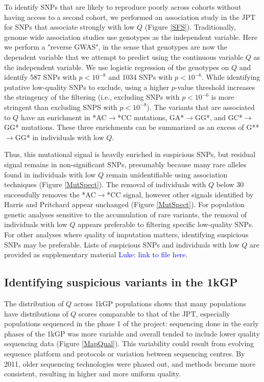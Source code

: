 \documentclass[9pt,lineno]{elife}
\newcommand{\luke}[1]{\textcolor{blue}{Luke: #1}}
\begin{document}
To identify SNPs that are likely to reproduce poorly across cohorts without having access to a second cohort, we performed an association study in the JPT for SNPs that associate strongly with low $Q$ (Figure \ref{SFS}).
Traditionally, genome wide association studies use genotypes as the independent variable. 
Here we perform a "reverse GWAS", in the sense that genotypes are now the dependent variable that we attempt to predict using the continuous variable $Q$ as the independent variable.
We use logistic regression of the genotypes on $Q$ and identify 587 SNPs with $p < 10^{-8}$ and 1034 SNPs with $ p < 10^{-6}$. 
While identifying putative low-quality SNPs to exclude, using a higher $p$-value threshold increases the stringency of the filtering (i.e., excluding SNPs with $ p < 10^{-6}$ is more stringent than excluding SNPS with $p < 10^{-8}$). 
The variants that are associated to $Q$ have an enrichment in *AC${\rightarrow}$*CC mutations, GA*${\rightarrow}$GG*, and GC*${\rightarrow}$GG* mutations.
These three enrichments can be summarized as an excess of G**${\rightarrow}$GG* in individuals with low $Q$.

Thus, this mutational signal is heavily enriched in suspicious SNPs, but residual signal remains in non-significant SNPs, presumably because many rare alleles found in individuals with low $Q$ remain unidentifiable using association techniques (Figure \ref{MutSpect}).
The removal of individuals with $Q$ below 30 successfully removes the *AC${\rightarrow}$*CC signal, however other signals identified by Harris and Pritchard appear unchanged (Figure \ref{MutSpect}).
For population genetic analyses sensitive to the accumulation of rare variants, the removal of individuals with low $Q$ appears preferable to filtering specific low-quality SNPs. 
For other analyses where quality of imputation matters, identifying suspicious SNPs may be preferable. 
Lists of suspicious SNPs and individuals with low $Q$ are provided as supplementary material \luke{link to file here}.

\subsection{Identifying suspicious variants in the 1kGP}
The distribution of $Q$ across 1kGP populations shows that many populations have distributions of $Q$ scores comparable to that of the JPT, especially populations sequenced in the phase 1 of the project: sequencing done in the early phases of the 1kGP was more variable and overall tended to include lower quality sequencing data (Figure \ref{MapQual}).
This variability could result from evolving sequence platform and protocols or variation between sequencing centres. 
By 2011, older sequencing technologies were phased out, and methods became more consistent, resulting in higher and more uniform quality.
\end{document}

